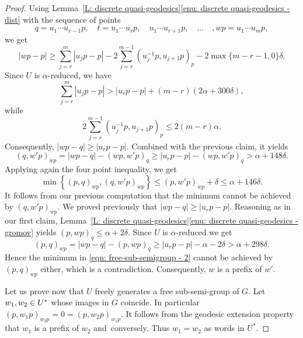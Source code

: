 \documentclass[JEP,XML,SOM,Unicode, NoEqCountersInSection,published]{cedram}
\theoremstyle{plain}
\theoremstyle{definition}
\begin{document}
\begin{proof}
Using Lemma~\ref{L: discrete quasi-geodesics}\eqref{enu: discrete quasi-geodesics - dist} with the sequence of points
\begin{equation*}
q = u_1\cdots u_{r-1}p, \quad t = u_1\cdots u_rp, \quad u_1\cdots u_{r+1}p, \quad\dots\quad, wp = u_1\cdots u_mp,
\end{equation*}
we get
\begin{equation*}
|wp -p| \geq \sum_{j = r}^m |u_jp - p| - 2 \sum_{j = r}^{m-1} (u_j^{-1}p,u_{j+1}p)_p - 2\max\{m-r-1,0\}\delta.
\end{equation*}
Since $U$ is $\alpha$-reduced, we have
\begin{equation*}
\sum_{j = r}^m |u_jp - p| > |u_rp - p| + (m-r)(2\alpha + 300\delta),
\end{equation*}
while
\begin{equation*}
2 \sum_{j = r}^{m-1} (u_j^{-1}p,u_{j+1}p)_p \leq 2(m-r)\alpha.
\end{equation*}
Consequently, $|wp - q| \geq |u_rp - p|$.
Combined with the previous claim, it yields
\begin{equation*}
(q, w'p)_{wp} = |wp - q| - (wp,w'p)_q \geq |u_rp - p| - (wp,w'p)_q > \alpha +148\delta.
\end{equation*}
Applying again the four point inequality, we get
\begin{equation}
\label{eqn: free-sub-semigroup - 2}
\min \left\{(p,q)_{wp}, (q, w'p)_{wp}\right\} \leq (p,w'p)_{wp} + \delta \leq \alpha + 146\delta.
\end{equation}
It follows from our previous computation that the minimum cannot be achieved by $(q,w'p)_{wp}$.
We proved previously that $|wp - q| \geq |u_rp - p|$.
Reasoning as in our first claim, Lemma~\ref{L: discrete quasi-geodesics}\eqref{enu: discrete quasi-geodesics - gromov} yields $(p,wp)_q \leq \alpha + 2\delta$.
Since $U$ is $\alpha$-reduced we get
\begin{equation*}
(p,q)_{wp} = |wp-q| - (p,wp)_q \geq |u_rp - p| - \alpha - 2\delta > \alpha+298\delta.
\end{equation*}
Hence the minimum in \eqref{eqn: free-sub-semigroup - 2} cannot be achieved by $(p,q)_{wp}$ either, which is a contradiction.
Consequently, $w$ is a prefix of $w'$.

Let us prove now that $U$ freely generates a free sub-semi-group of $G$.
Let $w_1, w_2 \in\nobreak U^*$ whose images in $G$ coincide.
In particular $(p, w_1p)_{w_2p} = 0 = (p,w_2p)_{w_1p}$.
It follows from the geodesic extension property that $w_1$ is a prefix of $w_2$ and~conversely.
Thus $w_1 = w_2$ as words in $U^*$.
\end{proof}
\end{document}
